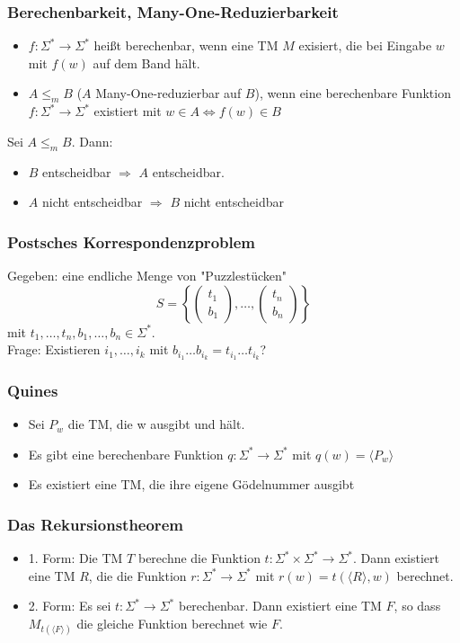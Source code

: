 \documentclass{beamer}
\newcommand{\F}{\Sigma^*}
\begin{document}
\begin{frame}
\frametitle{Berechenbarkeit, Many-One-Reduzierbarkeit}
\begin{itemize}
\item $f:\F\to\F$ heißt berechenbar, wenn eine TM $M$ exisiert, die bei Eingabe $w$ mit $f(w)$ auf dem Band hält.
\item $A\leq_m B$ ($A$ Many-One-reduzierbar auf $B$), wenn eine berechenbare Funktion $f:\F\to\F$ existiert mit $w\in A\Leftrightarrow f(w)\in B$
\end{itemize}
Sei $A\leq_m B$. Dann:
\begin{itemize}
\item $B$ entscheidbar $\Rightarrow$ $A$ entscheidbar.
\item $A$ nicht entscheidbar $\Rightarrow$ $B$ nicht entscheidbar
\end{itemize}
\end{frame}

\begin{frame}
\frametitle{Postsches Korrespondenzproblem}
Gegeben: eine endliche Menge von "Puzzlestücken"
$$S=\left\lbrace\begin{pmatrix}t_1\\b_1\end{pmatrix}, \ldots,\begin{pmatrix}t_n\\b_n\end{pmatrix}\right\rbrace$$ 
mit $t_1, \ldots, t_n, b_1, \ldots, b_n\in\F$.\\
Frage: Existieren $i_1, \ldots, i_k$ mit $b_{i_1}\ldots b_{i_k}=t_{i_1}\ldots t_{i_k}$?
\end{frame}

\begin{frame}
\frametitle{Quines}
\begin{itemize}
\item Sei $P_w$ die TM, die w ausgibt und hält.
\item Es gibt eine berechenbare Funktion $q:\F\to\F$ mit $q(w)=\langle P_w\rangle$\pause
\item Es existiert eine TM, die ihre eigene Gödelnummer ausgibt
\end{itemize}
\end{frame}

\begin{frame}
\frametitle{Das Rekursionstheorem}
\begin{itemize}
\item 1. Form: Die TM $T$ berechne die Funktion $t:\F\times\F\to\F$. Dann existiert eine TM $R$, die die Funktion $r:\F\to\F$ mit $r(w)=t(\langle R\rangle, w)$ berechnet.\pause
\item 2. Form: Es sei $t:\F\to\F$ berechenbar. Dann existiert eine TM $F$, so dass $M_{t(\langle F\rangle)}$ die gleiche Funktion berechnet wie $F$. 
\end{itemize}
\end{frame}
\end{document}
